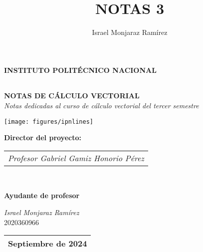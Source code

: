 \documentclass[11pt,a4paper]{article}
\author{ Israel Monjaraz Ramírez }
\title{NOTAS 3}
\begin{document}
	

	\pagestyle{empty}	 %
	
	
	
	\begin{center}
		{\LARGE \textbf{INSTITUTO POLITÉCNICO NACIONAL}}  \\ 
	\end{center} 
	\begin{tabular}{c}
	\end{tabular}
	
	\lfoot[]{ }
	\cfoot[]{}
	\rfoot[]{ }
	\renewcommand{\headrulewidth}{0pt}
	
	
	
	
	\vspace*{1cm}
	\begin{center}
		\begin{Large}
			\textbf{NOTAS DE CÁLCULO VECTORIAL}\\[0.2cm ]
			\textit{Notas dedicadas al curso de cálculo vectorial del tercer semestre}\\[0.4cm]
			
		\end{Large} 
	\end{center}
	\vspace*{1cm}
	\begin{center}
		\texttt{[image: figures/ipnlines]}\hspace{4cm} 
	\end{center}

	
	
	
	\begin{center}
		\begin{Large}
			\textbf{Director del proyecto:}\\[0.2cm] 
		\end{Large}
			
		\begin{tabular}{l}			
			
	\textit{Profesor Gabriel Gamiz Honorio Pérez}	
	
		\end{tabular}\\[1cm] 
		
				\begin{Large}
			\textbf{Ayudante de profesor}\\[0.5cm] 
		\end{Large}
	{\Large\textit{Israel Monjaraz Ramírez}}\\[0.2cm] 
2020360966

		
	\end{center}
 
	\vspace{0.8cm}
	\begin{flushright}
		\begin{tabular}{|c|}
			\hline
		Septiembre de 2024\\
			\hline
		\end{tabular}
	\end{flushright}
	
	
	
\end{document}
